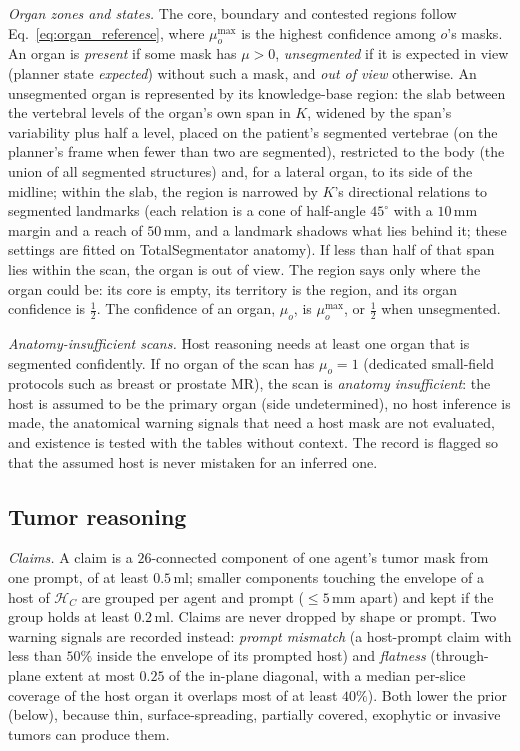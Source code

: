 \documentclass[fleqn,10pt]{olplainarticle}
\begin{document}
\emph{Organ zones and states.} The core, boundary and contested regions follow Eq.~\eqref{eq:organ_reference}, where
$\mu^{\max}_o$ is the highest confidence among $o$'s masks. An organ is \emph{present} if some mask has $\mu>0$,
\emph{unsegmented} if it is expected in view (planner state \emph{expected}) without such a mask, and \emph{out of view}
otherwise. An unsegmented organ is represented by its knowledge-base region: the slab between the vertebral levels of the
organ's own span in $K$, widened by the span's variability plus half a level, placed on the patient's segmented vertebrae
(on the planner's frame when fewer than two are segmented), restricted to the body (the union of all segmented structures)
and, for a lateral organ, to its side of the midline; within the slab, the region is narrowed by $K$'s directional
relations to segmented landmarks (each relation is a cone of half-angle $45^\circ$ with a $10$\,mm margin and a reach of
$50$\,mm, and a landmark shadows what lies behind it; these settings are fitted on TotalSegmentator anatomy). If less than half of that span lies within the scan, the organ is out of view. The region says only where
the organ could be: its core is empty, its territory is the region, and its organ confidence is $\tfrac12$. The confidence of an organ, $\mu_o$, is $\mu^{\max}_o$, or
$\tfrac12$ when unsegmented.

\emph{Anatomy-insufficient scans.} Host reasoning needs at least one organ that is segmented confidently. If no organ of the
scan has $\mu_o=1$ (dedicated small-field protocols such as breast or prostate MR), the scan is \emph{anatomy
insufficient}: the host is assumed to be the primary organ (side undetermined), no host inference is made, the anatomical
warning signals that need a host mask are not evaluated, and existence is tested with the tables without context. The
record is flagged so that the assumed host is never mistaken for an inferred one.

\subsection{Tumor reasoning}
\label{sec:tumor_details}
\emph{Claims.} A claim is a $26$-connected component of one agent's tumor mask from one prompt, of at least $0.5$\,ml;
smaller components touching the envelope of a host of $\mathcal{H}_C$ are grouped per agent and prompt ($\le5$\,mm apart)
and kept if the group holds at least $0.2$\,ml. Claims are never dropped by shape or prompt. Two warning signals are
recorded instead: \emph{prompt mismatch} (a host-prompt claim with less than $50\%$ inside the envelope of its prompted
host) and \emph{flatness} (through-plane extent at most $0.25$ of the in-plane diagonal, with a median per-slice coverage of
the host organ it overlaps most of at least $40\%$). Both lower the prior (below), because thin, surface-spreading,
partially covered, exophytic or invasive tumors can produce them.
\end{document}
